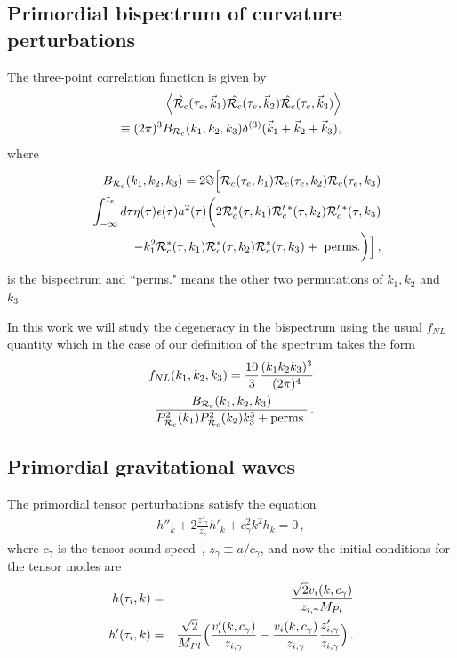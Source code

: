 \documentclass[aps,prl,amsmath,nofootinbib,twocolumn]{revtex4}
\newcommand{\3}{\partial}
\newcommand{\4}{\frac}
\newcommand{\5}{\delta}
\renewcommand\({\left(}
\renewcommand\){\right)}
\renewcommand\[{\left[}
\renewcommand\]{\right]}
\newcommand{\bea}{\begin{eqnarray}}
\newcommand{\eea}{\end{eqnarray}}
\begin{document}
\subsection{Primordial bispectrum of curvature perturbations}\label{pbcp}
The three-point correlation function is given by~\citep{m,xc}
\bea
\Braket{ \hat {\mathcal{R}_c}(\tau_e,\vec{k}_1) \hat {\mathcal{R}_c}(\tau_e,\vec{k}_2)  \hat {\mathcal{R}_c}(\tau_e,\vec{k}_3) } \\ \notag
\equiv (2\pi)^3 B_{\mathcal{R}_c}(k_1,k_2,k_3) \delta^{(3)}(\vec{k}_1+\vec{k}_2+\vec{k}_3) ,
\eea
where
\bea \label{b} \nonumber
  && B_{\mathcal{R}_c}(k_1,k_2,k_3)= 2 \Im\Bigl[ \mathcal{R}_c(\tau_e,k_1) \mathcal{R}_c(\tau_e,k_2)\mathcal{R}_c(\tau_e,k_3)\\ \nonumber
  && \int^{\tau_e}_{-\infty} d\tau \eta(\tau) \epsilon(\tau) a^2(\tau) \biggl( 2\mathcal{R}_c^*(\tau,k_1) \mathcal{R}_c'{}^*(\tau,k_2)\mathcal{R}_c'{}^*(\tau,k_3) \\ 
 &&  - k^2_1 \mathcal{R}_c^*(\tau,k_1)\mathcal{R}_c^*(\tau,k_2)\mathcal{R}_c^*(\tau,k_3) + \mbox{ perms.} \biggr)  \Bigr]\, ,
\eea
is the bispectrum and ``perms." means the other two permutations of $k_1,k_2$ and $k_3$.

In this work we will study the degeneracy in the bispectrum using the usual $f_{NL}$~\citep{hann} quantity which in the case of our definition of the spectrum takes the form
\bea\label{FNL}
  f_{NL}(k_1,k_2,k_3)=\frac{10}{3}\frac{(k_1 k_2 k_3)^3}{(2\pi)^4} \\
\frac{B_{\mathcal{R}_c}(k_1,k_2,k_3)}{P_{\mathcal{R}_c}^2(k_1)P_{\mathcal{R}_c}^2(k_2)k_3^3 +  \mbox{perms.} } \, \notag .
\eea

\subsection{Primordial gravitational waves}
The primordial tensor  perturbations satisfy the equation
~\cite{Planck:2013jfk,Ade:2015lrj}
\bea \label{eq:tpe}
h''_k+2\frac{z'_{\gamma}}{z_\gamma} h'_k+ c^2_\gamma k^2 h_k=0 \, ,
\eea 
where $c_{\gamma}$ is the tensor sound speed~\cite{Noumi:2014zqa, Cai:2016ldn},
$z_\gamma \equiv a /c_\gamma$, and now the initial conditions for the tensor modes are
\bea 
\label{eq:ic1h}
h(\tau_i,k) &=& \frac{\sqrt{2} v_i(k, c_{\gamma})}{z_{i,\gamma}  M_{Pl}} \\ 
\label{eq:ic2h}
h'(\tau_i,k) &=& \frac{\sqrt{2}}{ M_{Pl}} \Bigl( \frac{v'_i(k, c_{\gamma})}{z_{i,\gamma}}-\frac{v_i(k, c_{\gamma})}{z_{i,\gamma}} \frac{z'_{i,\gamma}}{z_{i,\gamma}} \Bigr)\, .
\eea
\end{document}
